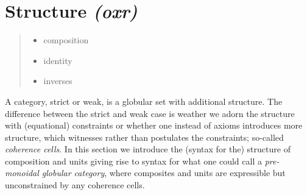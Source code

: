 \section{Structure \textit{(oxr)}}
\label{sec:structure}

\begin{quote}
  \begin{itemize}
  \item composition

  \item identity

  \item inverses

  \end{itemize}
\end{quote}

A category, strict or weak, is a globular set with additional
structure. The difference between the strict and weak case is weather
we adorn the structure with (equational) constraints or whether one instead
of axioms introduces more structure, which witnesses rather than postulates
the constraints; so-called \emph{coherence cells}. In this section we
introduce the (syntax for the) structure of composition and units
giving rise to syntax for what one could call a \emph{pre-monoidal
  globular category}, where composites and units are expressible but
unconstrained by any coherence cells.

